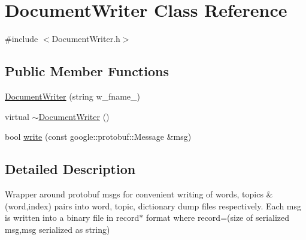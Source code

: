\hypertarget{class_document_writer}{
\section{DocumentWriter Class Reference}
\label{class_document_writer}
}


{\ttfamily \#include $<$DocumentWriter.h$>$}

\subsection*{Public Member Functions}
\begin{DoxyCompactItemize}
\item 
\hyperlink{class_document_writer_ab13000f42effbe825b5d3cdc7ed9615d}{DocumentWriter} (string w\_\-fname\_\-)
\item 
virtual \hyperlink{class_document_writer_a71da55790068366b80289c6da2f936fe}{$\sim$DocumentWriter} ()
\item 
bool \hyperlink{class_document_writer_a5d532963d09bdd313cd3c094e8bbff16}{write} (const google::protobuf::Message \&msg)
\end{DoxyCompactItemize}


\subsection{Detailed Description}
Wrapper around protobuf msgs for convenient writing of words, topics \& (word,index) pairs into word, topic, dictionary dump files respectively. Each msg is written into a binary file in record$\ast$ format where record=(size of serialized msg,msg serialized as string) 

